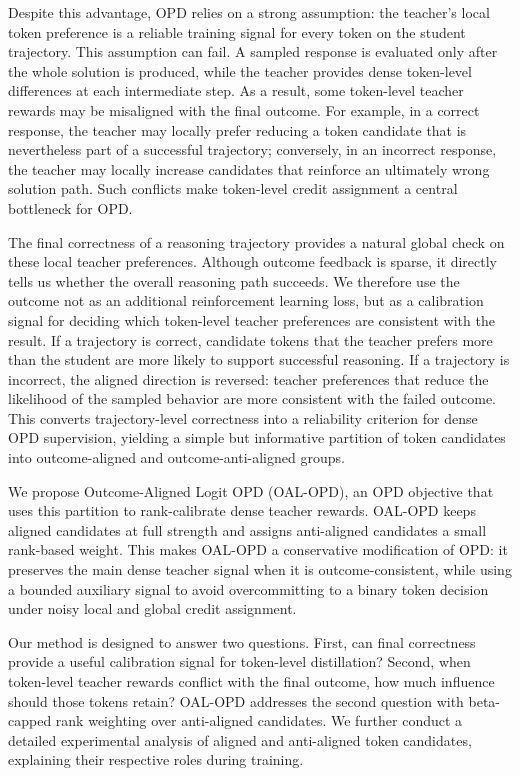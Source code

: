 \documentclass[letterpaper]{article} %
\begin{document}
Despite this advantage, OPD relies on a strong assumption: the teacher's local token preference is a reliable training signal for every token on the student trajectory. This assumption can fail. A sampled response is evaluated only after the whole solution is produced, while the teacher provides dense token-level differences at each intermediate step. As a result, some token-level teacher rewards may be misaligned with the final outcome. For example, in a correct response, the teacher may locally prefer reducing a token candidate that is nevertheless part of a successful trajectory; conversely, in an incorrect response, the teacher may locally increase candidates that reinforce an ultimately wrong solution path. Such conflicts make token-level credit assignment a central bottleneck for OPD.

The final correctness of a reasoning trajectory provides a natural global check on these local teacher preferences. Although outcome feedback is sparse, it directly tells us whether the overall reasoning path succeeds. We therefore use the outcome not as an additional reinforcement learning loss, but as a calibration signal for deciding which token-level teacher preferences are consistent with the result. If a trajectory is correct, candidate tokens that the teacher prefers more than the student are more likely to support successful reasoning. If a trajectory is incorrect, the aligned direction is reversed: teacher preferences that reduce the likelihood of the sampled behavior are more consistent with the failed outcome. This converts trajectory-level correctness into a reliability criterion for dense OPD supervision, yielding a simple but informative partition of token candidates into outcome-aligned and outcome-anti-aligned groups.

We propose Outcome-Aligned Logit OPD (OAL-OPD), an OPD objective that uses this partition to rank-calibrate dense teacher rewards. OAL-OPD keeps aligned candidates at full strength and assigns anti-aligned candidates a small rank-based weight. This makes OAL-OPD a conservative modification of OPD: it preserves the main dense teacher signal when it is outcome-consistent, while using a bounded auxiliary signal to avoid overcommitting to a binary token decision under noisy local and global credit assignment.

Our method is designed to answer two questions. First, can final correctness provide a useful calibration signal for token-level distillation? Second, when token-level teacher rewards conflict with the final outcome, how much influence should those tokens retain? OAL-OPD addresses the second question with beta-capped rank weighting over anti-aligned candidates. We further conduct a detailed experimental analysis of aligned and anti-aligned token candidates, explaining their respective roles during training.
\end{document}
